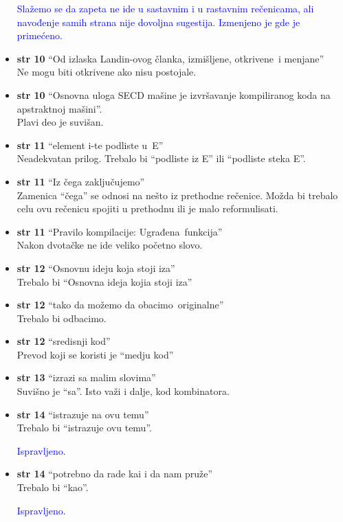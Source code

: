 \documentclass[a4paper]{report}
\newcommand{\odgovor}[1]{\textcolor{blue}{#1}}
\begin{document}
\begin{itemize}
\odgovor{Slažemo se da zapeta ne ide u sastavnim i u rastavnim rečenicama, ali navođenje samih strana nije dovoljna sugestija. Izmenjeno je gde je primećeno.}
\item \textbf{str 10} ``Od izlaska Landin-ovog članka, izmišljene, \color{blue}otkrivene\color{black}~i menjane'' \\ Ne mogu biti otkrivene ako nisu postojale.
\item \textbf{str 10} ``Osnovna uloga SECD mašine je izvršavanje kompiliranog koda \color{blue}na apstraktnoj mašini\color{black}''. \\ Plavi deo je suvišan.
\item \textbf{str 11} ``element i-te podliste \color{blue}u\color{black}~E'' \\ Neadekvatan prilog. Trebalo bi ``podliste iz E'' ili ``podliste steka E''.
\item \textbf{str 11} ``Iz čega zaključujemo'' \\ Zamenica ``čega'' se odnosi na nešto iz prethodne rečenice. Možda bi trebalo celu ovu rečenicu spojiti u prethodnu ili je malo reformulisati.
\item \textbf{str 11} ``Pravilo kompilacije: \color{blue}Ugrađena\color{black}~funkcija'' \\ Nakon dvotačke ne ide veliko početno slovo.
\item \textbf{str 12} ``Osnovnu ideju koja stoji iza'' \\ Trebalo bi ``Osnovna ideja kojia stoji iza''
\item \textbf{str 12} ``tako da možemo da \color{blue}obacimo\color{black}~originalne'' \\ Trebalo bi \color{blue}odbacimo\color{black}.
\item \textbf{str 12} ``sredisnji kod'' \\ Prevod koji se koristi je ``medju kod''
\item \textbf{str 13} ``izrazi \color{blue}sa\color{black} malim slovima'' \\ Suvišno je ``sa''. Isto važi i dalje, kod kombinatora.
\item \textbf{str 14} ``istrazuje na ovu temu'' \\ Trebalo bi ``istrazuje ovu temu''.

\odgovor{Ispravljeno.}

\item \textbf{str 14} ``potrebno da rade \color{blue}kai\color{black} i da nam pruže'' \\ Trebalo bi ``kao''.

\odgovor{Ispravljeno.}

\end{itemize}
\end{document}
